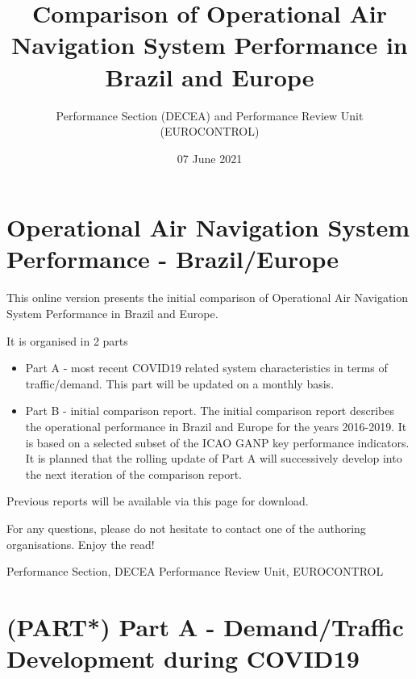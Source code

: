 \documentclass[
]{book}
\title{Comparison of Operational Air Navigation System Performance in Brazil and Europe}
\author{Performance Section (DECEA) and Performance Review Unit (EUROCONTROL)}
\date{07 June 2021}
\providecommand{\tightlist}{%
  \setlength{\itemsep}{0pt}\setlength{\parskip}{0pt}}
\begin{document}
\maketitle

{
\setcounter{tocdepth}{1}
\tableofcontents
}
\hypertarget{operational-air-navigation-system-performance---brazileurope}{%
\chapter*{\texorpdfstring{Operational Air Navigation System Performance - Brazil/Europe}{Operational Air Navigation System   Performance - Brazil/Europe}}\label{operational-air-navigation-system-performance---brazileurope}}

This online version presents the initial comparison of Operational Air Navigation System Performance in Brazil and Europe.

It is organised in 2 parts

\begin{itemize}
\tightlist
\item
  Part A - most recent COVID19 related system characteristics in terms of traffic/demand. This part will be updated on a monthly basis.
\item
  Part B - initial comparison report. The initial comparison report describes the operational performance in Brazil and Europe for the years 2016-2019. It is based on a selected subset of the ICAO GANP key performance indicators. It is planned that the rolling update of Part A will successively develop into the next iteration of the comparison report.
\end{itemize}

Previous reports will be available via this page for download.

For any questions, please do not hesitate to contact one of the authoring organisations.
Enjoy the read!

Performance Section, DECEA
Performance Review Unit, EUROCONTROL

\hypertarget{partA}{%
\chapter*{\texorpdfstring{(PART*) Part A - Demand/Traffic Development during COVID19}{(PART*) Part A - Demand/Traffic Development   during COVID19}}\label{partA}}
\end{document}
